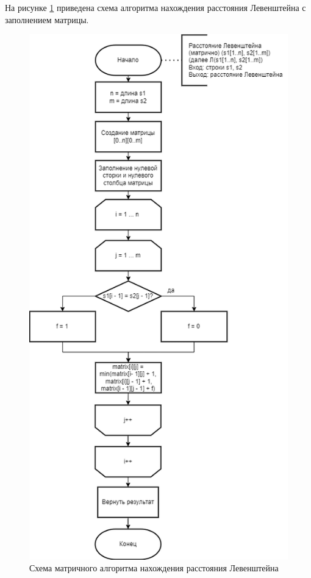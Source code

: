 На рисунке \ref{fig:levmat} приведена схема алгоритма нахождения расстояния Левенштейна с заполнением матрицы.
\begin{figure}[H]
	\centering
	\includegraphics[width=0.7\linewidth]{inc/img/lev_mat}
	\caption{Схема матричного алгоритма нахождения расстояния Левенштейна}
	\label{fig:levmat}
\end{figure}


